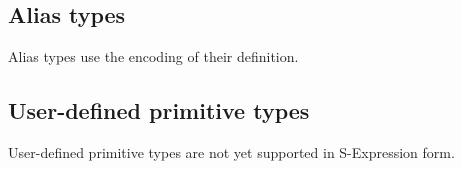 \subsection{Alias types}
Alias types use the encoding of their definition.

\subsection{User-defined primitive types}
User-defined primitive types are not yet supported in S-Expression form.

